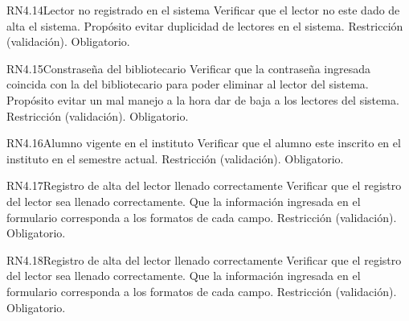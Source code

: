
\begin{BussinesRule}{RN4.14}{Lector no registrado en el sistema} 
	\BRitem[Descripción:] Verificar que el lector no este dado de alta el sistema. Propósito evitar duplicidad de lectores en el sistema.
	\BRitem[Tipo:] Restricción (validación).
	\BRitem[Nivel:] Obligatorio.
\end{BussinesRule}


\begin{BussinesRule}{RN4.15}{Constraseña del bibliotecario} 
	\BRitem[Descripción:] Verificar que la contraseña ingresada coincida con la del bibliotecario para poder eliminar al lector del sistema. Propósito evitar un mal manejo a la hora dar de baja a los lectores del sistema. 	
	\BRitem[Tipo:] Restricción (validación).
	\BRitem[Nivel:] Obligatorio.
\end{BussinesRule}


\begin{BussinesRule}{RN4.16}{Alumno vigente en el instituto} 
	\BRitem[Descripción:] Verificar que el alumno este inscrito en el instituto en el semestre actual.
	\BRitem[Tipo:] Restricción (validación).
	\BRitem[Nivel:] Obligatorio.
\end{BussinesRule}


\begin{BussinesRule}{RN4.17}{Registro de alta del lector llenado correctamente } 
	\BRitem[Descripción:] Verificar que el registro del lector sea llenado correctamente. Que la información ingresada en el formulario corresponda a los formatos de cada campo.
	\BRitem[Tipo:] Restricción (validación).
	\BRitem[Nivel:] Obligatorio.
\end{BussinesRule}


\begin{BussinesRule}{RN4.18}{Registro de alta del lector llenado correctamente } 
	\BRitem[Descripción:] Verificar que el registro del lector sea llenado correctamente. Que la información ingresada en el formulario corresponda a los formatos de cada campo.
	\BRitem[Tipo:] Restricción (validación).
	\BRitem[Nivel:] Obligatorio.
\end{BussinesRule}

